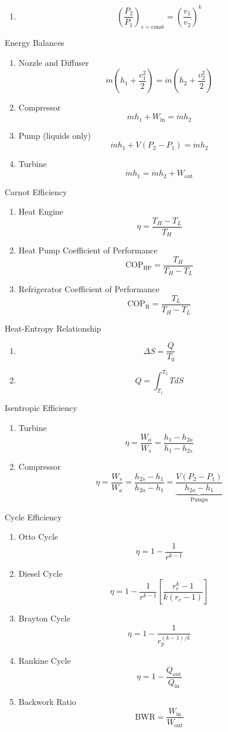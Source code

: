 \begin{multicols*}{2}[]
\begin{enumerate}
\item[]\[\left(\frac{P_2}{P_1}\right)_{s=\text{const}} = \left(\frac{v_1}{v_2}\right)^{k}\]
\end{enumerate}
\vspace{-1em}
Energy Balances
\vspace{-1em}
\begin{enumerate}
\item[] Nozzle and Diffuser \[\dot m \left(h_1 + \frac{v_1^2}{2}\right) = \dot m \left(h_2 + \frac{v_2^2}{2}\right)\]
\item[] Compressor \[\dot m h_1 + W_\text{in} = \dot m h_2\]
\item[] Pump (liquids only) \[\dot m h_1 + V(P_2-P_1) = \dot m h_2\]
\item[] Turbine \[\dot m h_1 = \dot m h_2 + W_\text{out}\]
\end{enumerate}
Carnot Efficiency
\vspace{-1em}
\begin{enumerate}
\item[] Heat Engine \[\eta = \frac{T_H-T_L}{T_H}\]
\item[] Heat Pump Coefficient of Performance \[\text{COP}_\text{HP} = \frac{T_H}{T_H-T_L}\]
\item[] Refrigerator Coefficient of Performance \[\text{COP}_\text{R} = \frac{T_L}{T_H-T_L}\]
\end{enumerate}
\vspace{-1em}
Heat-Entropy Relationship
\vspace{-1em}
\begin{enumerate}
    \item[] \[\Delta S = \frac{Q}{T_0}\]
    \item[] \[Q = \int_{T_1}^{T_2} TdS\]
\end{enumerate}
\vspace{-1em}
Isentropic Efficiency
\vspace{-1em}
\begin{enumerate}
\item[] Turbine \[\eta = \frac{W_a}{W_s} = \frac{h_1-h_{2a}}{h_1-h_{2s}}\]
\item[] Compressor \[\eta = \frac{W_s}{W_a} = \frac{h_{2s}-h_1}{h_{2a}-h_1} = \underbrace{\frac{V(P_2-P_1)}{h_{2a}-h_1}}_\text{Pumps}\]
\end{enumerate}
\vspace{-1em}
Cycle Efficiency
\vspace{-1em}
\begin{enumerate}
\item[] Otto Cycle \[\eta = 1 - \frac{1}{r^{k-1}}\]
\item[] Diesel Cycle \[\eta = 1 - \frac{1}{r^{k-1}}\left[\frac{r_c^k - 1}{k(r_c-1)}\right]\]
\item[] Brayton Cycle \[\eta = 1 - \frac{1}{r_p^{(k-1)/k}}\]
\item[] Rankine Cycle \[\eta = 1 - \frac{Q_\text{out}}{Q_\text{in}}\]
\item[] Backwork Ratio \[\text{BWR} = \frac{W_\text{in}}{W_\text{out}}\]
\end{enumerate}
\end{multicols*}

